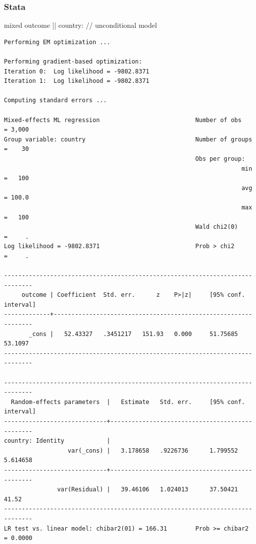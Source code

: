 \documentclass[
  letterpaper,
  DIV=11,
  numbers=noendperiod]{scrreprt}
\newenvironment{Shaded}{\begin{snugshade}}{\end{snugshade}}
\newcommand{\CommentTok}[1]{\textcolor[rgb]{0.37,0.37,0.37}{#1}}
\newcommand{\NormalTok}[1]{\textcolor[rgb]{0.00,0.23,0.31}{#1}}
\begin{document}
\subsubsection{Stata}

\begin{Shaded}
\begin{Highlighting}[]

\NormalTok{mixed outcome || country: }\CommentTok{// unconditional model}
\end{Highlighting}
\end{Shaded}

\begin{verbatim}
Performing EM optimization ...

Performing gradient-based optimization: 
Iteration 0:  Log likelihood = -9802.8371  
Iteration 1:  Log likelihood = -9802.8371  

Computing standard errors ...

Mixed-effects ML regression                           Number of obs    = 3,000
Group variable: country                               Number of groups =    30
                                                      Obs per group:
                                                                   min =   100
                                                                   avg = 100.0
                                                                   max =   100
                                                      Wald chi2(0)     =     .
Log likelihood = -9802.8371                           Prob > chi2      =     .

------------------------------------------------------------------------------
     outcome | Coefficient  Std. err.      z    P>|z|     [95% conf. interval]
-------------+----------------------------------------------------------------
       _cons |   52.43327   .3451217   151.93   0.000     51.75685     53.1097
------------------------------------------------------------------------------

------------------------------------------------------------------------------
  Random-effects parameters  |   Estimate   Std. err.     [95% conf. interval]
-----------------------------+------------------------------------------------
country: Identity            |
                  var(_cons) |   3.178658   .9226736      1.799552    5.614658
-----------------------------+------------------------------------------------
               var(Residual) |   39.46106   1.024013      37.50421       41.52
------------------------------------------------------------------------------
LR test vs. linear model: chibar2(01) = 166.31        Prob >= chibar2 = 0.0000
\end{verbatim}
\end{document}
